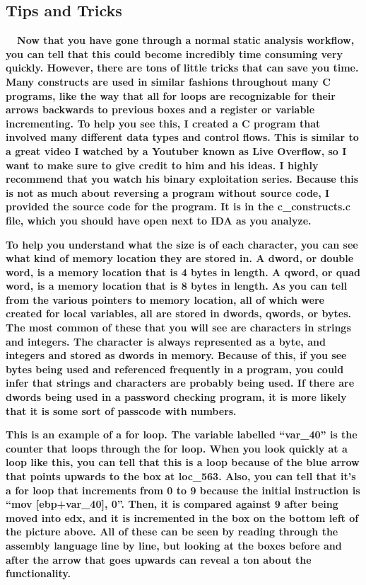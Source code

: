 \documentclass[letterpaper]{article}
\newcommand{\sitfig}[3]{
\begin{figure}[H]
\centering
\makebox[\textwidth][c]{
#2
}
\label{#1}
\end{figure}
}
\newcommand{\sitgfx}[4][scale=1.0]{
\sitfig{#3}{\texttt{[image: \#2]}}{#4}
}
\begin{document}
  
\sitgfx[width=6.5in,height=4.0626in]{FINALWORKINGDOCFORMERLYPRECURSOR-img065.png}{fig:unk}{TODO CAPTION}
 

\subsection{Tips and Tricks}

\textbf{ \ \ Now that you have gone through a normal static analysis workflow, you can tell that this could become
incredibly time consuming very quickly. However, there are tons of little tricks that can save you time. Many
constructs are used in similar fashions throughout many C programs, like the way that all for loops are recognizable
for their arrows backwards to previous boxes and a register or variable incrementing. To help you see this, I created a
C program that involved many different data types and control flows. This is similar to a great video I watched by a
Youtuber known as Live Overflow, so I want to make sure to give credit to him and his ideas. I highly recommend that
you watch his binary exploitation series. Because this is not as much about reversing a program without source code, I
provided the source code  for the program. It is in the c\_constructs.c file, which you should have open next to IDA as
you analyze.}

  
\sitgfx[width=3in,height=4.1252in]{FINALWORKINGDOCFORMERLYPRECURSOR-img066.png}{fig:unk}{TODO CAPTION}
 

\textbf{To help you understand what the size is of each character, you can see what kind of memory location they are
stored in. A dword, or double word, is a memory location that is 4 bytes in length. A qword, or quad word, is a memory
location that is 8 bytes in length. As you can tell from the various pointers to memory location, all of which were
created for local variables, all are stored in dwords, qwords, or bytes. The most common of these that you will see are
characters in strings and integers. The character is always represented as a byte, and integers and stored as dwords in
memory. Because of this, if you see bytes being used and referenced frequently in a program, you could infer that
strings and characters are probably being used. If there are dwords being used in a password checking program, it is
more likely that it is some sort of passcode with numbers.}

  
\sitgfx[width=6.4898in,height=3.802in]{FINALWORKINGDOCFORMERLYPRECURSOR-img067.png}{fig:unk}{TODO CAPTION}
 

\textbf{This is an example of a for loop. The variable labelled ``var\_40'' is the counter that loops through the for
loop. When you look quickly at a loop like this, you can tell that this is a loop because of the blue arrow that points
upwards to the box at loc\_563. Also, you can tell that it's a for loop that increments from 0 to 9 because the initial
instruction is ``mov [ebp+var\_40], 0''. Then, it is compared against 9 after being moved into edx, and it is
incremented in the box on the bottom left of the picture above. All of these can be seen by reading through the
assembly language line by line, but looking at the boxes before and after the arrow that goes upwards can reveal a ton
about the functionality.}
\end{document}
